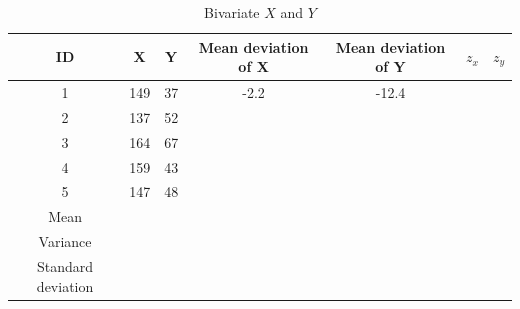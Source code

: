 \begin{table}[ht]
	\centering
	\caption{Bivariate $X$ and $Y$}
	\begin{tabular}{ccccccc}
		\hline
		ID                 & X   & Y  & Mean deviation of X & Mean deviation of Y & $z_x$ & $z_y$ \\
		\hline
		1                  & 149 & 37 & -2.2                & -12.4               &       &       \\
		2                  & 137 & 52 &                     &                     &       &       \\
		3                  & 164 & 67 &                     &                     &       &       \\
		4                  & 159 & 43 &                     &                     &       &       \\
		5                  & 147 & 48 &                     &                     &       &       \\
		\hline
		Mean               &     &    &                     &                     &       &       \\
		Variance           &     &    &                     &                     &       &       \\
		Standard deviation &     &    &                     &                     &       &       \\\hline
	\end{tabular}
	\label{tbl::04_05}
\end{table}
